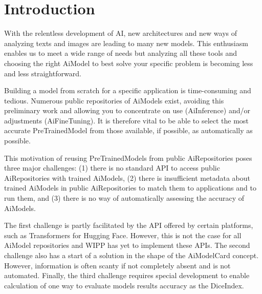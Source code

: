\section{Introduction}
\label{sec:intro}

With the relentless development of \Gls{AI}, new
architectures and new ways of analyzing texts and images are leading to many new
models. This enthusiasm enables us to meet a wide range of needs but analyzing
all these tools and choosing the right \Gls{AiModel} to best solve your specific
problem is becoming less and less straightforward.

Building a model from scratch for a specific application is time-consuming and
tedious. Numerous public repositories of \Gls{AiModel}s exist, avoiding this
preliminary work and allowing you to concentrate on use (\Gls{AiInference}) and/or
adjustments (\Gls{AiFineTuning}). It is therefore vital to be able to select the most
accurate \Gls{PreTrainedModel} from those available, if possible, as automatically
as possible.

This motivation of reusing \Gls{PreTrainedModel}s from public \Gls{AiRepositories} poses
three major challenges: (1) there is no standard \Gls{API} to access public
\Gls{AiRepositories} with trained \Gls{AiModel}s, (2) there is insufficient metadata about
trained \Gls{AiModel}s in public \Gls{AiRepositories} to match them to applications and to
run them, and (3) there is no way of automatically assessing the accuracy of
\Gls{AiModel}s.

The first challenge is partly facilitated by the \Gls{API} offered by certain
platforms, such as Transformers \cite{Transformers_HuggingFace} for Hugging
Face. However, this is not the case for all \Gls{AiModel} repositories and
\Gls{WIPP} has yet to implement these \Gls{API}s. The second challenge
also has a start of a solution in the shape of the \Gls{AiModelCard} concept. However,
information is often scanty if not completely absent and is not automated.
Finally, the third challenge requires special development to enable calculation
of one way to evaluate models results accuracy as the \Gls{DiceIndex}.
